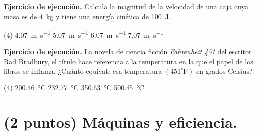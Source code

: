 \documentclass[12pt, letter]{exam}
\begin{document}
\begin{questions}
    \question \label{Ejercicio_12} \textbf{Ejercicio de ejecución. } Calcula la magnitud de la velocidad de una caja cuya masa es de \SI{4}{\kilo\gram} y tiene una energía cinética de \SI{100}{\joule}.
    \begin{tasks}(4)
        \task \SI{4.07}{\meter\per\second}
        \task \SI{5.07}{\meter\per\second}
        \task \SI{6.07}{\meter\per\second}
        \task \SI{7.07}{\meter\per\second}
    \end{tasks}
    \question \label{Ejercicio_13} \textbf{Ejercicio de ejecución. } La novela de ciencia ficción \textit{Fahrenheit 451} del escritor Rad Bradbury, el título hace referencia a la temperatura en la que el papel de los libros se inflama. ¿Cuánto equivale esa temperatura $(451 ^{\circ}\text{F})$ en grados Celsius?
    \begin{tasks}(4)
        \task \SI{200.46}{\degreeCelsius}
        \task \SI{232.77}{\degreeCelsius}
        \task \SI{350.63}{\degreeCelsius}
        \task \SI{500.45}{\degreeCelsius}
    \end{tasks}

    \section{(2 puntos) Máquinas y eficiencia.}

    

\end{questions}
\end{document}
